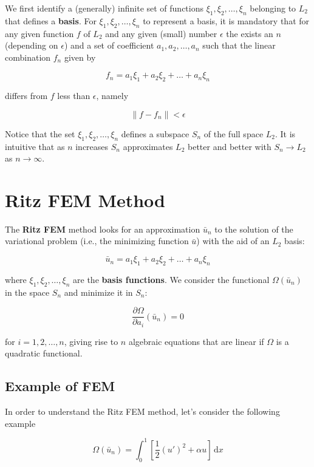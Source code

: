 \documentclass{article}
\begin{document}
We first identify a (generally) infinite set of functions
\(\xi_1, \xi_2, \ldots, \xi_n\) belonging to \(L_2\) that defines a
\textbf{basis}. For \(\xi_1, \xi_2, \ldots, \xi_n\) to represent a
basis, it is mandatory that for any given function \(f\) of \(L_2\) and
any given (small) number \(\epsilon\) the exists an \(n\) (depending on
\(\epsilon\)) and a set of coefficient \(a_1, a_2, \ldots, a_n\) such
that the linear combination \(f_n\) given by

\[
f_n = a_1 \xi_1 + a_2 \xi_2 + \ldots + a_n \xi_n
\]

differs from \(f\) less than \(\epsilon\), namely

\[
\left\lVert f - f_n \right\rVert < \epsilon
\]

Notice that the set \(\xi_1, \xi_2, \ldots, \xi_n\) defines a subspace
\(S_n\) of the full space \(L_2\). It is intuitive that as \(n\)
increases \(S_n\) approximates \(L_2\) better and better with
\(S_n \rightarrow L_2\) as \(n \rightarrow \infty\).

\section{Ritz FEM Method}\label{ritz-fem-method}

The \textbf{Ritz FEM} method looks for an approximation \(\bar{u}_n\) to
the solution of the variational problem (i.e., the minimizing function
\(\bar{u}\)) with the aid of an \(L_2\) basis:

\[
\bar{u}_n = a_1 \xi_1 + a_2 \xi_2 + \ldots + a_n \xi_n
\]

where \(\xi_1, \xi_2, \ldots, \xi_n\) are the \textbf{basis functions}.
We consider the functional \(\Omega(\bar{u}_n)\) in the space \(S_n\)
and minimize it in \(S_n\):

\[
\frac{\partial \Omega}{\partial a_i}(\bar{u}_n) = 0
\]

for \(i=1,2,\ldots,n\), giving rise to \(n\) algebraic equations that
are linear if \(\Omega\) is a quadratic functional.

\subsection{Example of FEM}\label{example-of-fem}

In order to understand the Ritz FEM method, let's consider the following
example

\[
\Omega(\bar{u}_n) = \int^{1}_{0}\left[\frac{1}{2}(u')^2 + \alpha u\right]\, \mathrm{d}x 
\]
\end{document}
